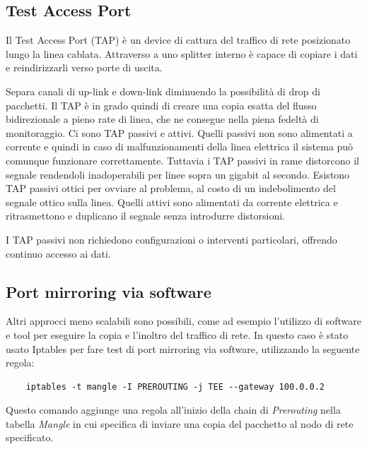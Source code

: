 \subsection{Test Access Port}
Il Test Access Port (TAP) è un device di cattura del traffico di rete posizionato lungo la linea cablata. Attraverso a uno splitter interno è capace di copiare i dati e reindirizzarli verso porte di uscita.

Separa canali di up-link e down-link diminuendo  la possibilità di drop di pacchetti.
Il TAP è in grado quindi di creare una copia esatta del flusso bidirezionale a pieno rate di linea, che ne consegue nella piena fedeltà di monitoraggio.
Ci sono TAP passivi e attivi.
Quelli passivi non sono alimentati a  corrente e quindi in caso di malfunzionamenti della linea elettrica il sistema può comunque funzionare correttamente. Tuttavia i TAP passivi in rame distorcono il segnale rendendoli inadoperabili per linee sopra un gigabit al secondo. Esistono TAP passivi ottici per ovviare al problema, al costo di un indebolimento del segnale ottico sulla linea.
Quelli attivi sono alimentati da corrente elettrica e ritrasmettono e duplicano il segnale senza introdurre distorsioni.

I TAP passivi non richiedono configurazioni o interventi particolari, offrendo continuo accesso ai dati.


\subsection{Port mirroring via software}
Altri approcci meno scalabili sono possibili, come ad esempio l'utilizzo di software e tool per eseguire la copia e l'inoltro del traffico di rete.
In questo caso è stato usato Iptables per fare test di port mirroring via software, utilizzando la seguente regola:
\begin{verbatim}
    iptables -t mangle -I PREROUTING -j TEE --gateway 100.0.0.2 
\end{verbatim}
Questo comando aggiunge una regola all'inizio della chain di \textit{Prerouting} nella tabella \textit{Mangle} in cui specifica di inviare una copia del pacchetto al nodo di rete specificato.



